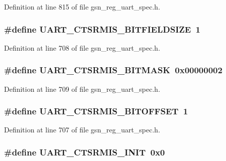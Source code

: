 Definition at line 815 of file gsn\_\-reg\_\-uart\_\-spec.h.

\hypertarget{a00575_a043dc23620964dd7c012cbe9d1f9c19a}{
\subsubsection[{UART\_\-CTSRMIS\_\-BITFIELDSIZE}]{\setlength{\rightskip}{0pt plus 5cm}\#define UART\_\-CTSRMIS\_\-BITFIELDSIZE~1}}
\label{a00575_a043dc23620964dd7c012cbe9d1f9c19a}


Definition at line 708 of file gsn\_\-reg\_\-uart\_\-spec.h.

\hypertarget{a00575_a532a9a9b8c5334d87daa965c02495421}{
\subsubsection[{UART\_\-CTSRMIS\_\-BITMASK}]{\setlength{\rightskip}{0pt plus 5cm}\#define UART\_\-CTSRMIS\_\-BITMASK~0x00000002}}
\label{a00575_a532a9a9b8c5334d87daa965c02495421}


Definition at line 709 of file gsn\_\-reg\_\-uart\_\-spec.h.

\hypertarget{a00575_a5d5a524e4c4df9d3129547563fbd492f}{
\subsubsection[{UART\_\-CTSRMIS\_\-BITOFFSET}]{\setlength{\rightskip}{0pt plus 5cm}\#define UART\_\-CTSRMIS\_\-BITOFFSET~1}}
\label{a00575_a5d5a524e4c4df9d3129547563fbd492f}


Definition at line 707 of file gsn\_\-reg\_\-uart\_\-spec.h.

\hypertarget{a00575_acf809f477601ed3d7508458ef2de60fb}{
\subsubsection[{UART\_\-CTSRMIS\_\-INIT}]{\setlength{\rightskip}{0pt plus 5cm}\#define UART\_\-CTSRMIS\_\-INIT~0x0}}
\label{a00575_acf809f477601ed3d7508458ef2de60fb}


